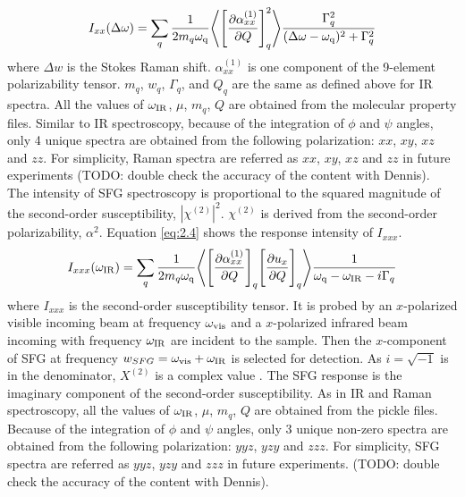 \begin{equation} \label{eq:2.3}
I_{xx}(\Delta \omega) = \sum_{q} \frac{1}{2 m_{q} \omega_{\rm q}} \Bigg \langle \Bigg\lbrack \frac{\partial \alpha_{xx}^{(1)}}{\partial Q} \Bigg\rbrack_{q} ^2 \Bigg\rangle \frac{\Gamma_q^2}{(\Delta \omega-\omega_{\rm q})^2 + \Gamma_q^2}
\end{equation} 
where $\Delta w$ is the Stokes Raman shift. $\alpha_{xx}^{(1)}$ is one component of the 9-element polarizability tensor. $m_q$, $w_q$, $\Gamma_q$, and $Q_q$ are the same as defined above for IR spectra. All the values of $\omega_{\rm IR}$, $\mu$, $m_q$, $Q$ are obtained from the molecular property files. Similar to IR spectroscopy, because of the integration of $\phi$ and $\psi$ angles, only 4 unique spectra are obtained from the following polarization: $xx$, $xy$, $xz$ and $zz$. For simplicity, Raman spectra are referred as $xx$, $xy$, $xz$ and $zz$ in future experiments (TODO: double check the accuracy of the content with Dennis). \\

The intensity of SFG spectroscopy is proportional to the squared magnitude of the second-order susceptibility, $\left|\chi^{(2)}\right|^{2}$. $\chi^{(2)}$ is derived from the second-order polarizability, $\alpha^{2}$. Equation \ref{eq:2.4} shows the response intensity of $I_{xxx}$. \\
\begin{equation} \label{eq:2.4}
I_{xxx}(\omega_{\rm IR}) = \sum_{q} \frac{1}{2 m_{q} \omega_{\rm q}} \Bigg \langle \Bigg\lbrack \frac{\partial \alpha_{xx}^{(1)}}{\partial Q} \Bigg\rbrack_{q} \Bigg\lbrack \frac{\partial u_{x}}{\partial Q} \Bigg\rbrack_{q} \Bigg\rangle \frac{1}{\omega_{\rm q}-\omega_{\rm IR}-i\Gamma_q}
\end{equation} 
where $I_{xxx}$ is the second-order susceptibility tensor. It is probed by an $x$-polarized visible incoming beam at frequency $\omega_{\rm vis}$ and a $x$-polarized infrared beam incoming with frequency $\omega_{\rm IR}$ are incident to the sample. Then the $x$-component of SFG at frequency $w_{SFG}=\omega_{\rm vis}+\omega_{\rm IR}$ is selected for detection. As $i=\sqrt{-1}$ is in the denominator, $X^{(2)}$ is a complex value \cite{KuoKaiHung:Thesis:2015}. The SFG response is the imaginary component of the second-order susceptibility. As in IR and Raman spectroscopy, all the values of $\omega_{\rm IR}$, $\mu$, $m_q$, $Q$ are obtained from the pickle files. Because of the integration of $\phi$ and $\psi$ angles, only 3 unique non-zero spectra are obtained from the following polarization: $yyz$, $yzy$ and $zzz$. For simplicity, SFG spectra are referred as $yyz$, $yzy$ and $zzz$ in future experiments.  (TODO: double check the accuracy of the content with Dennis). \\

